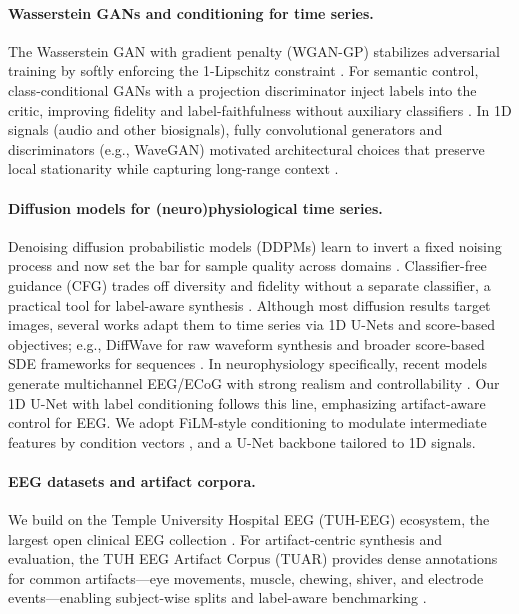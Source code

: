 \documentclass{article}
\begin{document}
\paragraph{Wasserstein GANs and conditioning for time series.}
The Wasserstein GAN with gradient penalty (WGAN-GP) stabilizes adversarial training by softly enforcing the 1-Lipschitz constraint \citep{gulrajani2017wgan}. For semantic control, class-conditional GANs with a projection discriminator inject labels into the critic, improving fidelity and label-faithfulness without auxiliary classifiers \citep{miyato2018cgan}. In 1D signals (audio and other biosignals), fully convolutional generators and discriminators (e.g., WaveGAN) motivated architectural choices that preserve local stationarity while capturing long-range context \citep{donahue2019adversarialaudio}. 

\paragraph{Diffusion models for (neuro)physiological time series.}
Denoising diffusion probabilistic models (DDPMs) learn to invert a fixed noising process and now set the bar for sample quality across domains \citep{ho2020denoisingprobabilistic,nichol2021improveddenoising,dhariwal2021beatgans}. Classifier-free guidance (CFG) trades off diversity and fidelity without a separate classifier, a practical tool for label-aware synthesis \citep{ho2022classifierfree}. Although most diffusion results target images, several works adapt them to time series via 1D U-Nets and score-based objectives; e.g., DiffWave for raw waveform synthesis and broader score-based SDE frameworks for sequences \citep{kong2020diffwaveversatile,song2020scorebased}. In neurophysiology specifically, recent models generate multichannel EEG/ECoG with strong realism and controllability \citep{vetter2024generatingrealistic,tosato2023eegsynthetic}. Our 1D U-Net with label conditioning follows this line, emphasizing artifact-aware control for EEG. We adopt FiLM-style conditioning to modulate intermediate features by condition vectors \citep{perez2018filmvisual}, and a U-Net backbone \citep{ronneberger2015unet} tailored to 1D signals.

\paragraph{EEG datasets and artifact corpora.}
We build on the Temple University Hospital EEG (TUH-EEG) ecosystem, the largest open clinical EEG collection \citep{obeid2016tuh}. For artifact-centric synthesis and evaluation, the TUH EEG Artifact Corpus (TUAR) provides dense annotations for common artifacts—eye movements, muscle, chewing, shiver, and electrode events—enabling subject-wise splits and label-aware benchmarking \citep{hamid2020tuar}. 
\end{document}
